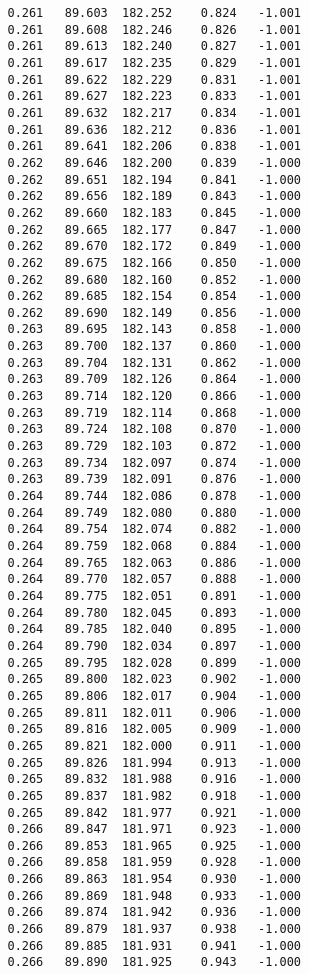 \begin{verbatim}
   0.261   89.603  182.252    0.824   -1.001
   0.261   89.608  182.246    0.826   -1.001
   0.261   89.613  182.240    0.827   -1.001
   0.261   89.617  182.235    0.829   -1.001
   0.261   89.622  182.229    0.831   -1.001
   0.261   89.627  182.223    0.833   -1.001
   0.261   89.632  182.217    0.834   -1.001
   0.261   89.636  182.212    0.836   -1.001
   0.261   89.641  182.206    0.838   -1.001
   0.262   89.646  182.200    0.839   -1.000
   0.262   89.651  182.194    0.841   -1.000
   0.262   89.656  182.189    0.843   -1.000
   0.262   89.660  182.183    0.845   -1.000
   0.262   89.665  182.177    0.847   -1.000
   0.262   89.670  182.172    0.849   -1.000
   0.262   89.675  182.166    0.850   -1.000
   0.262   89.680  182.160    0.852   -1.000
   0.262   89.685  182.154    0.854   -1.000
   0.262   89.690  182.149    0.856   -1.000
   0.263   89.695  182.143    0.858   -1.000
   0.263   89.700  182.137    0.860   -1.000
   0.263   89.704  182.131    0.862   -1.000
   0.263   89.709  182.126    0.864   -1.000
   0.263   89.714  182.120    0.866   -1.000
   0.263   89.719  182.114    0.868   -1.000
   0.263   89.724  182.108    0.870   -1.000
   0.263   89.729  182.103    0.872   -1.000
   0.263   89.734  182.097    0.874   -1.000
   0.263   89.739  182.091    0.876   -1.000
   0.264   89.744  182.086    0.878   -1.000
   0.264   89.749  182.080    0.880   -1.000
   0.264   89.754  182.074    0.882   -1.000
   0.264   89.759  182.068    0.884   -1.000
   0.264   89.765  182.063    0.886   -1.000
   0.264   89.770  182.057    0.888   -1.000
   0.264   89.775  182.051    0.891   -1.000
   0.264   89.780  182.045    0.893   -1.000
   0.264   89.785  182.040    0.895   -1.000
   0.264   89.790  182.034    0.897   -1.000
   0.265   89.795  182.028    0.899   -1.000
   0.265   89.800  182.023    0.902   -1.000
   0.265   89.806  182.017    0.904   -1.000
   0.265   89.811  182.011    0.906   -1.000
   0.265   89.816  182.005    0.909   -1.000
   0.265   89.821  182.000    0.911   -1.000
   0.265   89.826  181.994    0.913   -1.000
   0.265   89.832  181.988    0.916   -1.000
   0.265   89.837  181.982    0.918   -1.000
   0.265   89.842  181.977    0.921   -1.000
   0.266   89.847  181.971    0.923   -1.000
   0.266   89.853  181.965    0.925   -1.000
   0.266   89.858  181.959    0.928   -1.000
   0.266   89.863  181.954    0.930   -1.000
   0.266   89.869  181.948    0.933   -1.000
   0.266   89.874  181.942    0.936   -1.000
   0.266   89.879  181.937    0.938   -1.000
   0.266   89.885  181.931    0.941   -1.000
   0.266   89.890  181.925    0.943   -1.000

\end{verbatim}

